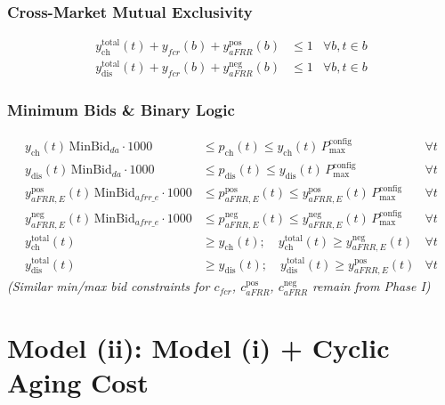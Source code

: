\documentclass[11pt, a4paper]{article}
\begin{document}
\subsubsection{Cross-Market Mutual Exclusivity}
\begin{align}
    y^{\mathrm{total}}_{\mathrm{ch}}(t) + y_{fcr}(b) + y^{\mathrm{pos}}_{aFRR}(b) &\le 1 & \forall b, t \in b \\
    y^{\mathrm{total}}_{\mathrm{dis}}(t) + y_{fcr}(b) + y^{\mathrm{neg}}_{aFRR}(b) &\le 1 & \forall b, t \in b
\end{align}

\subsubsection{Minimum Bids \& Binary Logic}
\begin{align}
    y_{\mathrm{ch}}(t)\,\text{MinBid}_{da} \cdot 1000 &\le p_{\mathrm{ch}}(t) \le y_{\mathrm{ch}}(t)\,P^{\mathrm{config}}_{\max} & \forall t \\
    y_{\mathrm{dis}}(t)\,\text{MinBid}_{da} \cdot 1000 &\le p_{\mathrm{dis}}(t) \le y_{\mathrm{dis}}(t)\,P^{\mathrm{config}}_{\max} & \forall t \\
    y^{\mathrm{pos}}_{aFRR,E}(t)\,\text{MinBid}_{afrr\_e} \cdot 1000 &\le p^{\mathrm{pos}}_{aFRR,E}(t) \le y^{\mathrm{pos}}_{aFRR,E}(t)\,P^{\mathrm{config}}_{\max} & \forall t \\
    y^{\mathrm{neg}}_{aFRR,E}(t)\,\text{MinBid}_{afrr\_e} \cdot 1000 &\le p^{\mathrm{neg}}_{aFRR,E}(t) \le y^{\mathrm{neg}}_{aFRR,E}(t)\,P^{\mathrm{config}}_{\max} & \forall t \\
    y^{\mathrm{total}}_{\mathrm{ch}}(t) &\ge y_{\mathrm{ch}}(t); \quad y^{\mathrm{total}}_{\mathrm{ch}}(t) \ge y^{\mathrm{neg}}_{aFRR,E}(t) & \forall t \\
    y^{\mathrm{total}}_{\mathrm{dis}}(t) &\ge y_{\mathrm{dis}}(t); \quad y^{\mathrm{total}}_{\mathrm{dis}}(t) \ge y^{\mathrm{pos}}_{aFRR,E}(t) & \forall t
\end{align}
\textit{(Similar min/max bid constraints for $c_{fcr}$, $c^{\mathrm{pos}}_{aFRR}$, $c^{\mathrm{neg}}_{aFRR}$ remain from Phase I)}



\section{Model (ii): Model (i) + Cyclic Aging Cost}
\end{document}
